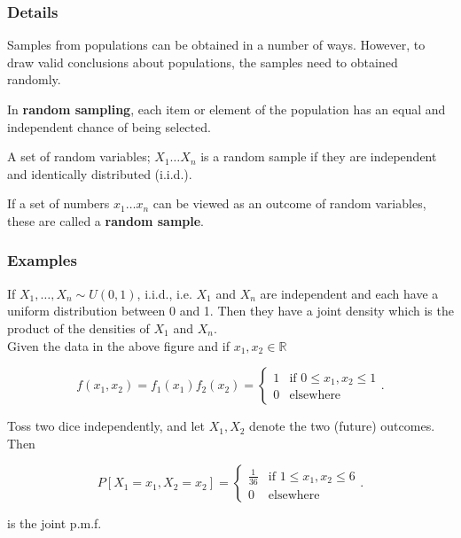 \documentclass[12pt,a4paper]{article}
\theoremstyle{regla}
\theoremstyle{remark}
\theoremstyle{definition}
\theoremstyle{nonumberbreak}
\begin{document}
\subsubsection{Details}
Samples from populations can be obtained in a number of ways. However, to draw valid conclusions about populations, the samples need to obtained randomly.
\begin{defn}
In {\bf random sampling}, each item or element of the population has an equal and independent chance of being selected.
\end{defn}
A set of random variables; $X_1 \ldots X_n$ is a random sample if they are independent and identically distributed (i.i.d.).
\begin{defn}
If a set of numbers $x_1 \ldots x_n$ can be viewed as an outcome of random variables, these are called a {\bf random sample}.
\end{defn}
\subsubsection{Examples}
\begin{xmpl}

If $X_1, \ldots, X_n  \sim U(0,1)$, i.i.d., i.e.  $X_1$ and $X_n$ are independent and each have a uniform distribution between 0 and 1. Then they have a joint density which is the product of the densities of $X_1$ and $X_n$.\\

Given the data in the above figure and if  $x_1 , x_2 \in \mathbb{R}$

$$
f(x_1, x_2) = f_1(x_1) f_2(x_2) =
\begin{cases}
  1 & \text{if } 0 \leq x_1, x_2 \leq 1 \\
  0 & \text{elsewhere}
\end{cases}.
$$

\end{xmpl}
\begin{xmpl}

 Toss two dice independently, and let $X_1, X_2$ denote the two (future) outcomes.\\

Then 


$$
 P[X_1 = x_1, X_2 =  x_2]=
 \begin{cases}
  \frac{1}{36} & \text{if } 1 \leq x_1, x_2 \leq 6 \\
  0 & \text{elsewhere}
\end{cases}.
$$

is the joint p.m.f.

\end{xmpl}
\end{document}
